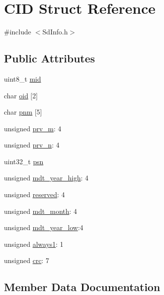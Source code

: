 \hypertarget{struct_c_i_d}{}\section{C\+ID Struct Reference}
\label{struct_c_i_d}


{\ttfamily \#include $<$Sd\+Info.\+h$>$}

\subsection*{Public Attributes}
\begin{DoxyCompactItemize}
\item 
uint8\+\_\+t \hyperlink{struct_c_i_d_addb3f98dd20ccc0ffdf300d5ef9c6333}{mid}
\item 
char \hyperlink{struct_c_i_d_a12cb950aa46c62c8af1e530006f97031}{oid} \mbox{[}2\mbox{]}
\item 
char \hyperlink{struct_c_i_d_a6484cd56fc4bacfa815c12d8682129ba}{pnm} \mbox{[}5\mbox{]}
\item 
unsigned \hyperlink{struct_c_i_d_a7735b6ae8914c4731de30de32c0ac75c}{prv\+\_\+m}\+: 4
\item 
unsigned \hyperlink{struct_c_i_d_a15237f61edb06b3b6dd25b8c1f15280a}{prv\+\_\+n}\+: 4
\item 
uint32\+\_\+t \hyperlink{struct_c_i_d_ada215f8541fa46078461d8da9574fc5e}{psn}
\item 
unsigned \hyperlink{struct_c_i_d_a77cd7bf11f5d63fbcb4b2eec2559b645}{mdt\+\_\+year\+\_\+high}\+: 4
\item 
unsigned \hyperlink{struct_c_i_d_a458794d915efa88aef06f5b0612895ac}{reserved}\+: 4
\item 
unsigned \hyperlink{struct_c_i_d_a8b0c4317cc18c03335d7cde147aa8e8d}{mdt\+\_\+month}\+: 4
\item 
unsigned \hyperlink{struct_c_i_d_ac36633e5eef5d901fe999aad7862508b}{mdt\+\_\+year\+\_\+low}\+:4
\item 
unsigned \hyperlink{struct_c_i_d_af14e08ffbcafb218efae70ad5b8f2c51}{always1}\+: 1
\item 
unsigned \hyperlink{struct_c_i_d_a69b946a732f93b7a66aff4002ca00b77}{crc}\+: 7
\end{DoxyCompactItemize}


\subsection{Member Data Documentation}
\mbox{\label{struct_c_i_d_af14e08ffbcafb218efae70ad5b8f2c51}} 
